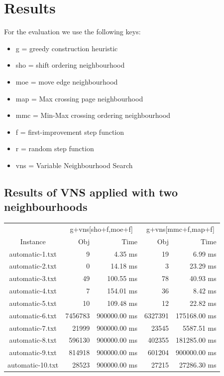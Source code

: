 \documentclass[11pt]{article}
\begin{document}
\section{Results}
For the evaluation we use the following keys:
\begin{itemize}
	\item g = greedy construction heuristic
	\item sho = shift ordering neighbourhood
	\item moe = move edge neighbourhood
	\item map = Max crossing page neighbourhood
	\item mmc = Min-Max crossing ordering neighbourhood 
	\item f = first-improvement step function
	\item r = random step function
	\item vns = Variable Neighbourhood Search
\end{itemize}
\subsection{Results of VNS applied with two neighbourhoods}
{
\center
\begin{tabular}{c|rr|rr}
                 & \multicolumn{2}{c}{g+vns[sho+f,moe+f]}   & \multicolumn{2}{c}{g+vns[mmc+f,map+f]}  \\
Instance         & Obj     & Time                & Obj     & Time               \\
\hline
automatic-1.txt  & 9       & 4.35 ms             & 19      & 6.99 ms            \\
automatic-2.txt  & 0       & 14.18 ms            & 3       & 23.29 ms           \\
automatic-3.txt  & 49      & 100.55 ms           & 78      & 40.93 ms           \\
automatic-4.txt  & 7       & 154.01 ms           & 36      & 8.42 ms            \\
automatic-5.txt  & 10      & 109.48 ms           & 12      & 22.82 ms           \\
automatic-6.txt  & 7456783 & 900000.00 ms        & 6327391 & 175168.00 ms       \\
automatic-7.txt  & 21999   & 900000.00 ms        & 23545   & 5587.51 ms         \\
automatic-8.txt  & 596130  & 900000.00 ms        & 402355  & 181285.00 ms       \\
automatic-9.txt  & 814918  & 900000.00 ms        & 601204  & 900000.00 ms       \\
automatic-10.txt & 28523   & 900000.00 ms        & 27215   & 27286.30 ms        \\
\end{tabular}
}
\end{document}
